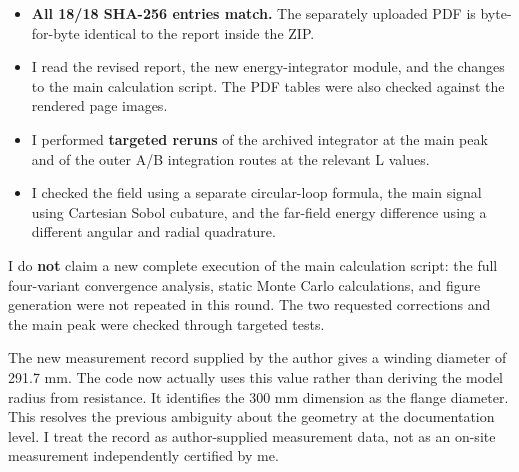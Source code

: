 \documentclass[10pt,a4paper]{article}
\begin{document}
{\par
\vspace{2pt}\par\vspace{0.5pt}
\par
\begin{itemize}\setlength{\itemsep}{0.5pt}\setlength{\parskip}{0pt}\setlength{\topsep}{1pt}
\item \textbf{All 18/18 SHA-256 entries match.} The separately uploaded PDF is byte-for-byte identical to the report inside the ZIP.
\item I read the revised report, the new energy-integrator module, and the changes to the main calculation script. The PDF tables were also checked against the rendered page images.
\item I performed \textbf{targeted reruns} of the archived integrator at the main peak and of the outer A/B integration routes at the relevant L values.
\item I checked the field using a separate circular-loop formula, the main signal using Cartesian Sobol cubature, and the far-field energy difference using a different angular and radial quadrature.
\end{itemize}
\par
I do \textbf{not} claim a new complete execution of the main calculation script: the full four-variant convergence analysis, static Monte Carlo calculations, and figure generation were not repeated in this round. The two requested corrections and the main peak were checked through targeted tests.
\par
\par
\vspace{2pt}\par\vspace{0.5pt}
\par
The new measurement record supplied by the author gives a winding diameter of 291.7 mm. The code now actually uses this value rather than deriving the model radius from resistance. It identifies the 300 mm dimension as the flange diameter. This resolves the previous ambiguity about the geometry at the documentation level. I treat the record as author-supplied measurement data, not as an on-site measurement independently certified by me.
\par
\begin{center}
\end{center}}
\end{document}
